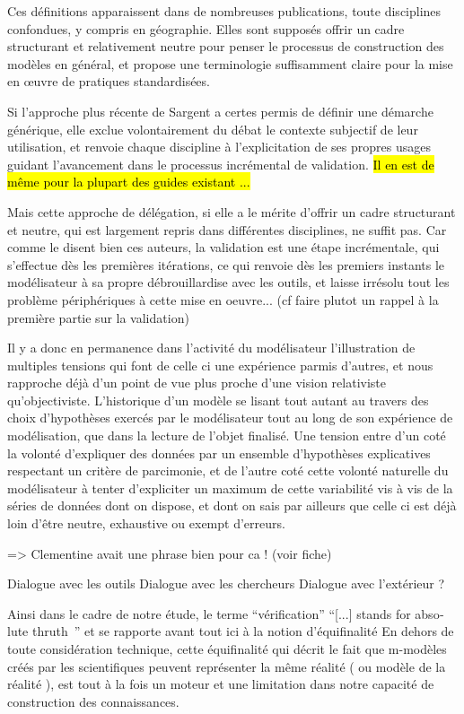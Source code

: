 Ces définitions apparaissent dans de nombreuses publications, toute disciplines confondues, y compris en géographie. Elles sont supposés offrir un cadre structurant et relativement neutre pour penser le processus de construction des modèles en général, et propose une terminologie suffisamment claire pour la mise en œuvre de pratiques standardisées.

Si l'approche plus récente de Sargent a certes permis de définir une démarche générique, elle exclue volontairement du débat le contexte subjectif de leur utilisation, et renvoie chaque discipline à l'explicitation de ses propres usages guidant l'avancement dans le processus incrémental de validation. \hl{Il en est de même pour la plupart des guides existant ...}

Mais cette approche de délégation, si elle a le mérite d'offrir un cadre structurant et neutre, qui est largement repris dans différentes disciplines, ne suffit pas. Car comme le disent bien ces auteurs, la validation est une étape incrémentale, qui s'effectue dès les premières itérations, ce qui renvoie dès les premiers instants le modélisateur à sa propre débrouillardise avec les outils, et laisse irrésolu tout les problème périphériques à cette mise en oeuvre... (cf faire plutot un rappel à la première partie sur la validation)

Il y a donc en permanence dans l'activité du modélisateur l'illustration de multiples tensions qui font de celle ci une expérience parmis d'autres, et nous rapproche déjà d'un point de vue plus proche d'une vision relativiste qu'objectiviste. L'historique d'un modèle se lisant tout autant au travers des choix d'hypothèses exercés par le modélisateur tout au long de son expérience de modélisation, que dans la lecture de l'objet finalisé. Une tension entre d'un coté la volonté d'expliquer des données par un ensemble d'hypothèses explicatives respectant un critère de parcimonie, et de l'autre coté cette volonté naturelle du modélisateur à tenter d'expliciter un maximum de cette variabilité vis à vis de la séries de données dont on dispose, et dont on sais par ailleurs que celle ci est déjà loin d'être neutre, exhaustive ou exempt d'erreurs.

=> Clementine avait une phrase bien pour ca ! (voir fiche)

Dialogue avec les outils
Dialogue avec les chercheurs
Dialogue avec l'extérieur
?

Ainsi dans le cadre de notre étude, le terme \enquote{vérification}  \foreignquote{english}{[...] stands for absolute thruth } \autocite{David2009} \autocite{Oreskes1994} et se rapporte avant tout ici à la notion d'équifinalité \autocite{OSullivan2004} En dehors de toute considération technique, cette équifinalité qui décrit le fait que m-modèles créés par les scientifiques peuvent représenter la même réalité ( ou modèle de la réalité ), est tout à la fois un moteur et une limitation dans notre capacité de construction des connaissances.



